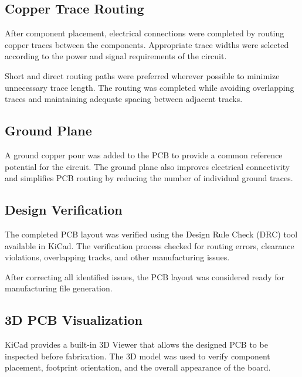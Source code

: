 
\subsection{Copper Trace Routing}

After component placement, electrical connections were completed by routing copper traces between the components. Appropriate trace widths were selected according to the power and signal requirements of the circuit.

Short and direct routing paths were preferred wherever possible to minimize unnecessary trace length. The routing was completed while avoiding overlapping traces and maintaining adequate spacing between adjacent tracks.


\subsection{Ground Plane}

A ground copper pour was added to the PCB to provide a common reference potential for the circuit. The ground plane also improves electrical connectivity and simplifies PCB routing by reducing the number of individual ground traces.


\subsection{Design Verification}

The completed PCB layout was verified using the Design Rule Check (DRC) tool available in KiCad. The verification process checked for routing errors, clearance violations, overlapping tracks, and other manufacturing issues.

After correcting all identified issues, the PCB layout was considered ready for manufacturing file generation.


\subsection{3D PCB Visualization}

KiCad provides a built-in 3D Viewer that allows the designed PCB to be inspected before fabrication. The 3D model was used to verify component placement, footprint orientation, and the overall appearance of the board.

